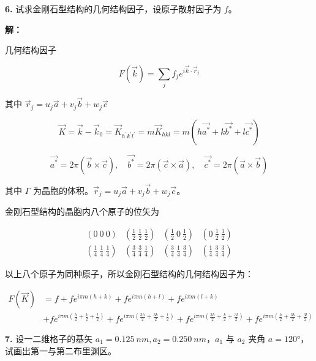 \noindent \textbf{6.\quad} 试求金刚石型结构的几何结构因子，设原子散射因子为 $f$。

\noindent \textbf{解：}

几何结构因子

\begin{equation*}
    F(\vec{k}) = \sum_j f_j e^{i\vec{k}\cdot\vec{r}_j}
\end{equation*}

其中 $\vec{r}_j=u_j\vec{a}+v_j\vec{b}+w_j\vec{c}$

\begin{equation*}
    \vec{K} = \vec{k} - \vec{k}_0 = \vec{K}_{h^\prime k^\prime l^\prime} = m \vec{K}_{hkl} = m (h\vec{a^*}+k\vec{b^*}+l\vec{c^*})
\end{equation*}

\begin{equation*}
    \vec{a^*} = 2\pi(\vec{b}\times\vec{c}), \quad \vec{b^*} = 2\pi(\vec{c}\times\vec{a}), \quad \vec{c^*} = 2\pi(\vec{a}\times\vec{b})
\end{equation*}

其中 $\Gamma$ 为晶胞的体积。$\vec{r}_j=u_j\vec{a}+v_j\vec{b}+w_j\vec{c}$。

金刚石型结构的晶胞内八个原子的位矢为

\begin{equation*}
    \begin{matrix}
    (0\ 0\ 0) & (\frac{1}{2}\ \frac{1}{2}\ \frac{1}{2}) & (\frac{1}{2}\ 0\ \frac{1}{2}) & (0\ \frac{1}{2}\ \frac{1}{2}) \\
    (\frac{1}{4}\ \frac{1}{4}\ \frac{1}{4}) & (\frac{3}{4}\ \frac{3}{4}\ \frac{1}{4}) & (\frac{3}{4}\ \frac{1}{4}\ \frac{3}{4}) & (\frac{1}{4}\ \frac{3}{4}\ \frac{3}{4})
    \end{matrix}
\end{equation*}

以上八个原子为同种原子，所以金刚石型结构的几何结构因子为：

\begin{align*}
    F(\vec{K}) &= f + f e^{i\pi m(h+k)} + f e^{i\pi m(h+l)} + f e^{i\pi m(l+k)} \\
    &+ f e^{i\pi m\left(\frac{h}{2}+\frac{k}{2}+\frac{l}{2}\right)} + f e^{i\pi m\left(\frac{3h}{2}+\frac{3k}{2}+\frac{l}{2}\right)} + f e^{i\pi m\left(\frac{3h}{2}+\frac{k}{2}+\frac{3l}{2}\right)} + f e^{i\pi m\left(\frac{h}{2}+\frac{3k}{2}+\frac{3l}{2}\right)}
\end{align*}

\noindent \textbf{7.\quad} 设一二维格子的基矢 $a_1=\qty{0.125}{nm}, a_2=\qty{0.250}{nm}$，$a_1$ 与 $a_2$ 夹角 $a=\ang{120}$，试画出第一与第二布里渊区。

